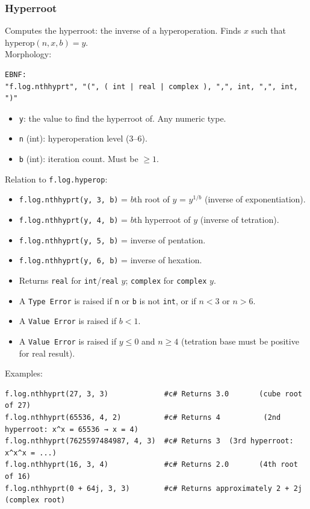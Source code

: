 \subsubsection{Hyperroot}
Computes the hyperroot: the inverse of a hyperoperation. Finds $x$ such that $\text{hyperop}(n, x, b) = y$.\\
Morphology:
\begin{verbatim}
EBNF:
"f.log.nthhyprt", "(", ( int | real | complex ), ",", int, ",", int, ")"
\end{verbatim}
\begin{itemize}
\item \texttt{y}: the value to find the hyperroot of. Any numeric type.
\item \texttt{n} (int): hyperoperation level (3--6).
\item \texttt{b} (int): iteration count. Must be $\geq 1$.
\end{itemize}

\noindent Relation to \texttt{f.log.hyperop}:
\begin{itemize}
\item \texttt{f.log.nthhyprt(y, 3, b)} = $b$th root of $y$ = $y^{1/b}$ (inverse of exponentiation).
\item \texttt{f.log.nthhyprt(y, 4, b)} = $b$th hyperroot of $y$ (inverse of tetration).
\item \texttt{f.log.nthhyprt(y, 5, b)} = inverse of pentation.
\item \texttt{f.log.nthhyprt(y, 6, b)} = inverse of hexation.
\end{itemize}

\begin{itemize}
\item Returns \texttt{real} for \texttt{int}/\texttt{real} $y$; \texttt{complex} for \texttt{complex} $y$.
\item A \texttt{Type Error} is raised if \texttt{n} or \texttt{b} is not \texttt{int}, or if $n < 3$ or $n > 6$.
\item A \texttt{Value Error} is raised if $b < 1$.
\item A \texttt{Value Error} is raised if $y \leq 0$ and $n \geq 4$ (tetration base must be positive for real result).
\end{itemize}

Examples:
\begin{verbatim}
f.log.nthhyprt(27, 3, 3)             #c# Returns 3.0       (cube root of 27)
f.log.nthhyprt(65536, 4, 2)          #c# Returns 4          (2nd hyperroot: x^x = 65536 → x = 4)
f.log.nthhyprt(7625597484987, 4, 3)  #c# Returns 3  (3rd hyperroot: x^x^x = ...)
f.log.nthhyprt(16, 3, 4)             #c# Returns 2.0       (4th root of 16)
f.log.nthhyprt(0 + 64j, 3, 3)        #c# Returns approximately 2 + 2j  (complex root)
\end{verbatim}

